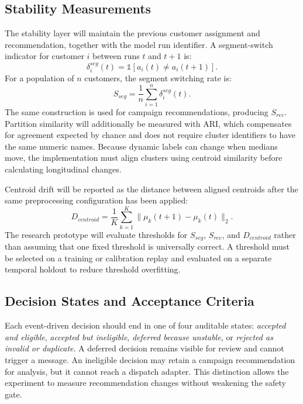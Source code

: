 \documentclass[conference]{IEEEtran}
\begin{document}
\subsection{Stability Measurements}
The stability layer will maintain the previous customer assignment and recommendation, together with the model run identifier. A segment-switch indicator for customer $i$ between runs $t$ and $t+1$ is:
\begin{equation}
\delta_i^{seg}(t)=\mathbb{1}[a_i(t)\ne a_i(t+1)].
\end{equation}
For a population of $n$ customers, the segment switching rate is:
\begin{equation}
S_{seg}=\frac{1}{n}\sum_{i=1}^{n}\delta_i^{seg}(t).
\end{equation}
The same construction is used for campaign recommendations, producing $S_{rec}$. Partition similarity will additionally be measured with ARI, which compensates for agreement expected by chance and does not require cluster identifiers to have the same numeric names. Because dynamic labels can change when medians move, the implementation must align clusters using centroid similarity before calculating longitudinal changes.

Centroid drift will be reported as the distance between aligned centroids after the same preprocessing configuration has been applied:
\begin{equation}
D_{centroid}=\frac{1}{K}\sum_{k=1}^{K}\lVert\mu_k(t+1)-\mu_k(t)\rVert_2.
\end{equation}
The research prototype will evaluate thresholds for $S_{seg}$, $S_{rec}$, and $D_{centroid}$ rather than assuming that one fixed threshold is universally correct. A threshold must be selected on a training or calibration replay and evaluated on a separate temporal holdout to reduce threshold overfitting.

\subsection{Decision States and Acceptance Criteria}
Each event-driven decision should end in one of four auditable states: \emph{accepted and eligible}, \emph{accepted but ineligible}, \emph{deferred because unstable}, or \emph{rejected as invalid or duplicate}. A deferred decision remains visible for review and cannot trigger a message. An ineligible decision may retain a campaign recommendation for analysis, but it cannot reach a dispatch adapter. This distinction allows the experiment to measure recommendation changes without weakening the safety gate.
\end{document}
